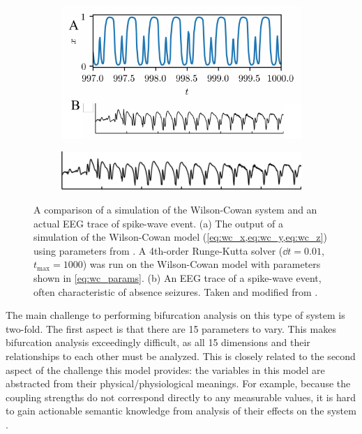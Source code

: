 \begin{figure}[ht]
  \centering
  \begin{subfigure}{0.5\textwidth}
    \centering
    \includegraphics[width=\textwidth]{figure/wc}
    \caption[Wilson-Cowan simulation]{}
    \label{fig:wc}
  \end{subfigure}%
  \begin{subfigure}{0.5\textwidth}
    \centering
    \includegraphics[width=\textwidth]{figure/swe}
    \caption[Spike-wave event]{}
    \label{fig:swe}
  \end{subfigure}
  \caption[Wilson-Cowan simulation and spike-wave event]{A comparison of a simulation of the Wilson-Cowan system and an actual EEG trace of spike-wave event.
    (a) The output of a simulation of the Wilson-Cowan model (\cref{eq:wc_x,eq:wc_y,eq:wc_z}) using parameters from \cite{Wang2012}.
    A 4th-order Runge-Kutta solver ($\dd{t} = 0.01$, $t_{\text{max}} = 1000$) was run on the Wilson-Cowan model with parameters shown in \cref{eq:wc_params}.
    (b) An EEG trace of a spike-wave event, often characteristic of absence seizures.
    Taken and modified from \cite{Marten2009}.
  }
  \label{fig:wc_and_swe}
\end{figure}

The main challenge to performing bifurcation analysis on this type of system is two-fold.
The first aspect is that there are 15 parameters to vary.
This makes bifurcation analysis exceedingly difficult, as all 15 dimensions and their relationships to each other must be analyzed.
This is closely related to the second aspect of the challenge this model provides: the variables in this model are abstracted from their physical/physiological meanings.
For example, because the coupling strengths do not correspond directly to any measurable values, it is hard to gain actionable semantic knowledge from analysis of their effects on the system \cite{Jirsa2014}.

